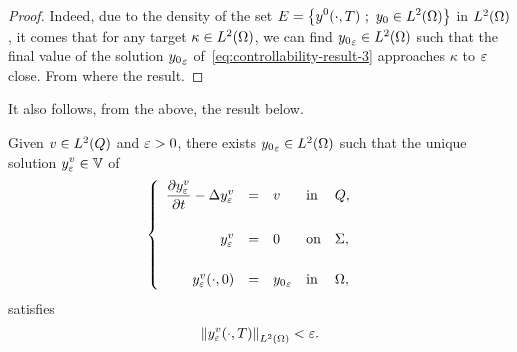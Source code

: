 \begin{proof}%
    Indeed, due to the density of the set $\displaystyle E = \left\{{%
        y^{0}\!\left({\cdot,T}\right)\,;\ y_{0}\in \Ldeux{\Omega}
    }\right\}$ in $L^{2}\!\left({\Omega}\right)$, it comes that for any target
    $\kappa\in L^{2}\!\left({\Omega}\right)$, we can find ${y_{0}}_{\varepsilon}\in
    L^{2}\!\left({\Omega}\right)$ such that the final value of the solution
    $\displaystyle {y_{0}}_{\varepsilon}$ of~\eqref{eq:controllability-result-3}
    approaches $\kappa$ to $\varepsilon$ close. From where the result.
\end{proof}

It also follows, from the above, the result below.

\begin{corollaire}\label{coro:controllability-result-3}%
    Given $v\in L^{2}\!\left({Q}\right)$ and $\varepsilon > 0$, there exists ${y_{0}}_{\varepsilon}\in
    L^{2}\!\left({\Omega}\right)$ such that the unique solution $\displaystyle
    y_{\varepsilon}^{v}\in \mathbb{V}$ of
    \begin{equation}\label{eq:controllability-result-5}
        \begin{cases}\displaystyle
            \begin{array}{rclll}
                \dfrac{\partial{}y_{\varepsilon}^{v}}{\partial{}t} - \Delta y_{\varepsilon}^{v} & = & v &
                \text{in} & Q,\\
                \\
                y_{\varepsilon}^{v} & = & 0 & \text{on} & \Sigma,\\
                \\
                y_{\varepsilon}^{v}\!\left({\cdot,0}\right) & = & {y_{0}}_{\varepsilon}
                & \text{in} & \Omega,
            \end{array}
        \end{cases}
    \end{equation}
    satisfies
    \begin{equation}\label{eq:controllability-result-6}
        {\left\|{y_{\varepsilon}^{v}\!\left({\cdot,T}\right) }\right\|}_{L^{2}\left({\Omega}\right)} < \varepsilon.
    \end{equation}
\end{corollaire}

